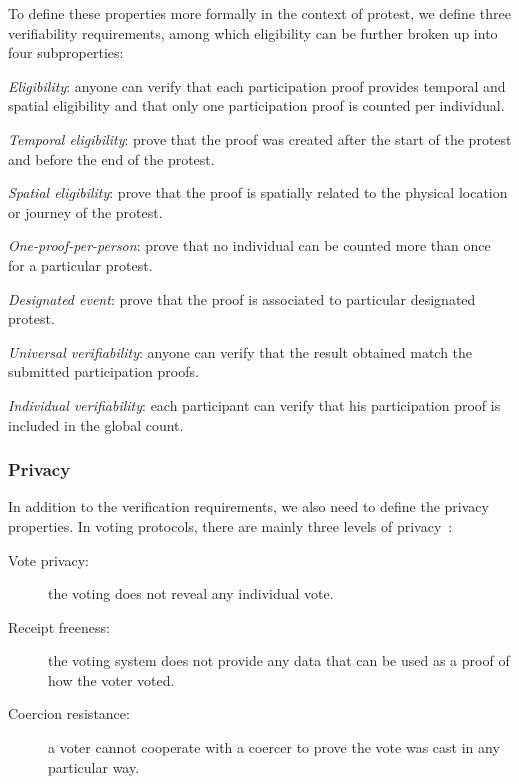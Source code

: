 To define these properties more formally in the context of protest, we define three verifiability requirements, among which eligibility can be further broken up into four subproperties:
\begin{requirements}[V]
  \item\label{EligibilityVerif} \emph{Eligibility}: anyone can verify that each participation proof provides temporal and spatial eligibility and that only one participation proof is counted per individual.
    \begin{requirements}
    \item\label{TemporallyRelated} \emph{Temporal eligibility}: prove that the proof was created after the start of the protest and before the end of the protest.
    \item\label{SpatiallyRelated} \emph{Spatial eligibility}: prove that the proof is spatially related to the physical location or journey of the protest.
    \item\label{CountOnce} \emph{One-proof-per-person}: prove that no individual can be counted more than once for a particular protest.
    \item\label{DesignatedEvent} \emph{Designated event}: prove that the proof is associated to particular designated protest.
    \end{requirements}

  \item\label{UniversalVerif} \emph{Universal verifiability}: anyone can verify that the result obtained match the submitted participation proofs.

  \item\label{IndividualVerif} \emph{Individual verifiability}: each participant can verify that his participation proof is included in the global count.
\end{requirements}

\subsubsection{Privacy}%
\label{Privacy}

In addition to the verification requirements, we also need to define the privacy properties.
In voting protocols, there are mainly three levels of privacy~\cite{VerifyingPrivacyPropertiesOfVotingProtocols}:
\begin{description}
\item[Vote privacy:] the voting does not reveal any individual vote.
\item[Receipt freeness:] the voting system does not provide any data that can be used as a proof of how the voter voted.
\item[Coercion resistance:] a voter cannot cooperate with a coercer to prove the vote was cast in any particular way.
\end{description}


